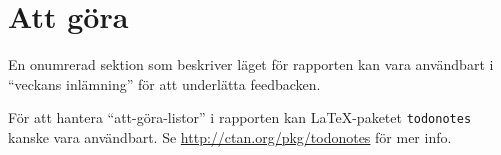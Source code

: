 
\newpage
\section*{Att göra}
En onumrerad sektion som beskriver läget för rapporten kan vara användbart i ``veckans inlämning'' för att underlätta feedbacken.

För att hantera ``att-göra-listor'' i rapporten kan La\TeX-paketet \verb|todonotes| kanske vara användbart. Se \url{http://ctan.org/pkg/todonotes} för mer info.




